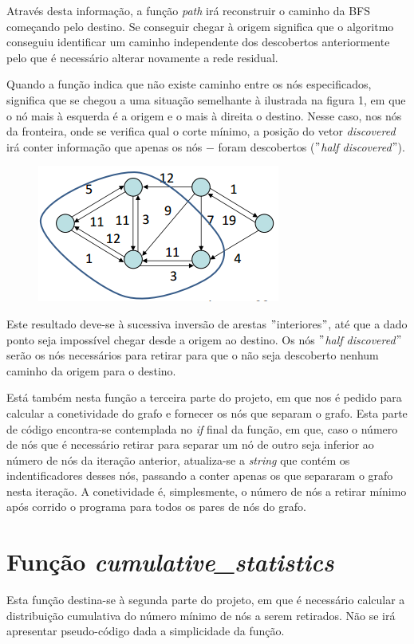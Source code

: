 \documentclass[a4paper]{article}
\begin{document}
Através desta informação, a função \textit{path} irá reconstruir o caminho da BFS começando pelo destino. Se conseguir chegar à origem significa que o algoritmo conseguiu identificar um caminho independente dos descobertos anteriormente pelo que é necessário alterar novamente a rede residual.

Quando a função indica que não existe caminho entre os nós especificados, significa que se chegou a uma situação semelhante à ilustrada na figura 1, em que o nó mais à esquerda é a origem e o mais à direita o destino. Nesse caso, nos nós da fronteira, onde se verifica qual o corte mínimo, a posição do vetor \textit{discovered} irá conter informação que apenas os nós $-$ foram descobertos ($"$\textit{half discovered}$"$).


\begin{figure}[hb]
  \centering
  \includegraphics[scale=0.50]{slides.png}
  \caption{}
\end{figure}

Este resultado deve-se à sucessiva inversão de arestas $"$interiores$"$, até que a dado ponto seja impossível chegar desde a origem ao destino. Os nós $"$\textit{half discovered}$"$ serão os nós necessários para retirar para que o não seja descoberto nenhum caminho da origem para o destino.

Está também nesta função a terceira parte do projeto, em que nos é pedido para calcular a conetividade do grafo e fornecer os nós que separam o grafo. Esta parte de código encontra-se contemplada no \textit{if} final da função, em que, caso o número de nós que é necessário retirar para separar um nó de outro seja inferior ao número de nós da iteração anterior, atualiza-se a \textit{string} que contém os indentificadores desses nós, passando a conter apenas os que separaram o grafo nesta iteração. A conetividade é, simplesmente, o número de nós a retirar mínimo após corrido o programa para todos os pares de nós do grafo.

\section{Função \textit{cumulative\_statistics}}
Esta função destina-se à segunda parte do projeto, em que é necessário calcular a distribuição cumulativa do número mínimo de nós a serem retirados. Não se irá apresentar pseudo-código dada a simplicidade da função.
\end{document}

